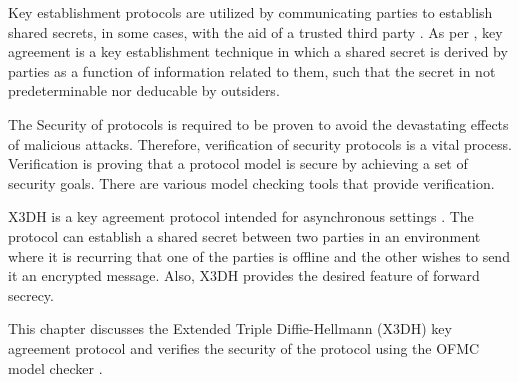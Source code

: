 
Key establishment protocols are utilized by communicating parties to establish shared secrets, in some cases, with the aid of a trusted third party \cite{handbookOfAppliedCrypto}. As per \cite{handbookOfAppliedCrypto}, key agreement is a key establishment technique in which a shared secret is derived by parties as a function of information related to them, such that the secret in not predeterminable nor deducable by outsiders.
\par
The Security of protocols is required to be proven to avoid the devastating effects of malicious attacks. Therefore, verification of security protocols is a vital process. Verification is proving that a protocol model is secure by achieving a set of security goals. There are various model checking tools that provide verification.
\par
X3DH is a key agreement protocol intended for asynchronous settings \cite{x3dh}. The protocol can establish a shared secret between two parties in an environment where it is recurring that one of the parties is offline and the other wishes to send it an encrypted message. Also, X3DH provides the desired feature of forward secrecy. 
\par
This chapter discusses the Extended Triple Diffie-Hellmann (X3DH) key agreement protocol \cite{x3dh} and verifies the security of the protocol using the OFMC model checker \cite{ofmc}.